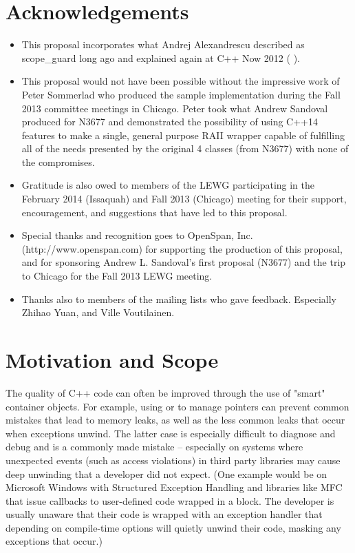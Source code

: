 \documentclass[ebook,11pt,article]{memoir}
\begin{document}
\chapter{Acknowledgements}
\begin{itemize}
\item This proposal incorporates what Andrej Alexandrescu described as scope_guard long ago and explained again at C++ Now 2012 (%
).
\item This proposal would not have been possible without the impressive work of Peter Sommerlad who produced the sample implementation during the Fall 2013 committee meetings in Chicago.  Peter took what Andrew Sandoval produced for N3677 and demonstrated the possibility of using C++14 features to make a single, general purpose RAII wrapper capable of fulfilling all of the needs presented by the original 4 classes (from N3677) with none of the compromises.
\item Gratitude is also owed to members of the LEWG participating in the February 2014 (Issaquah) and Fall 2013 (Chicago) meeting for their support, encouragement, and suggestions that have led to this proposal.
\item Special thanks and recognition goes to OpenSpan, Inc. (http://www.openspan.com) for supporting the production of this proposal, and for sponsoring Andrew L. Sandoval's first proposal (N3677) and the trip to Chicago for the Fall 2013 LEWG meeting.
\item Thanks also to members of the mailing lists who gave feedback. Especially Zhihao Yuan, and Ville Voutilainen.
\end{itemize}

\chapter{Motivation and Scope}
The quality of C++ code can often be improved through the use of "smart" container objects.  For example, using  or  to manage pointers can prevent common mistakes that lead to memory leaks, as well as the less common leaks that occur when exceptions unwind.  The latter case is especially difficult to diagnose and debug and is a commonly made mistake -- especially on systems where unexpected events (such as access violations) in third party libraries may cause deep unwinding that a developer did not expect.  (One example would be on Microsoft Windows with Structured Exception Handling and libraries like MFC that issue callbacks to user-defined code wrapped in a  block.  The developer is usually unaware that their code is wrapped with an exception handler that depending on compile-time options will quietly unwind their code, masking any exceptions that occur.)
\end{document}
